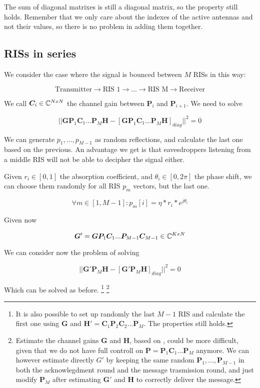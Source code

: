 The sum of diagonal matrixes is still a diagonal matrix, so the property still holds. Remember that we only care about the indexes of the active antennas and not their values, so there is no problem in adding them together.

\subsection{RISs in series}

We consider the case where the signal is bounced between $M$ RISs in this way:

\begin{equation}
  \text{Transmitter} \rightarrow \text{RIS 1} \rightarrow ... \rightarrow \text{RIS M} \rightarrow \text{Receiver}
\end{equation}

We call $\bm{C}_i \in \mathbb{C}^{NxN}$ the channel gain between $\bm{P}_i$ and $\bm{P}_{i+1}$. We need to solve

\begin{equation}
  || \bm{GP}_1\bm{C}_1...\bm{P}_M\bm{H} - [\bm{GP}_1\bm{C}_1...\bm{P}_M\bm{H}]_{diag} || ^2 = 0
\end{equation}

We can generate $p_1, ..., p_{M-1}$ as random reflections, and calculate the last one based on the previous. An advantage we get is that eavesdroppers listening from a middle RIS will not be able to decipher the signal either.

Given $r_i \in [0, 1]$ the absorption coefficient, and $\theta_i \in [0, 2\pi]$ the phase shift, we can choose them randomly for all RIS $p_m$ vectors, but the last one.

\begin{equation}
  \forall m \in [1, M-1] : p_m[i] = \eta * r_i * e^{j\theta_i}
\end{equation}

Given now

\begin{equation}
  \bm{G}' = \bm{GP}_1\bm{C}_1...\bm{P}_{M-1}\bm{C}_{M-1} \in \mathbb{C}^{KxN}
\end{equation}

We can consider now the problem of solving

\begin{equation}
  || \bm{G}'\bm{P}_M\bm{H} - [\bm{G}'\bm{P}_M\bm{H}]_{diag} || ^2 = 0
\end{equation}

Which can be solved as before.
\footnote{It is also possible to set up randomly the last $M-1$ RIS and calculate the first one using $\bm{G}$ and $\bm{H}'=\bm{C}_1\bm{P}_2\bm{C}_2...\bm{P}_M$. The properties still holds.}
\footnote{Estimate the channel gains $\bm{G}$ and $\bm{H}$, based on \cite{8879620}, could be more difficult, given that we do not have full controll on $\bm{P}=\bm{P}_1\bm{C}_1...\bm{P}_M$ anymore. We can however estimate directly $G'$ by keeping the same random $\bm{P}_1, ..., \bm{P}_{M-1}$ in both the acknowlegdment round and the message trasmission round, and just modify $\bm{P}_M$ after estimating $\bm{G}'$ and $\bm{H}$ to correctly deliver the message.}

